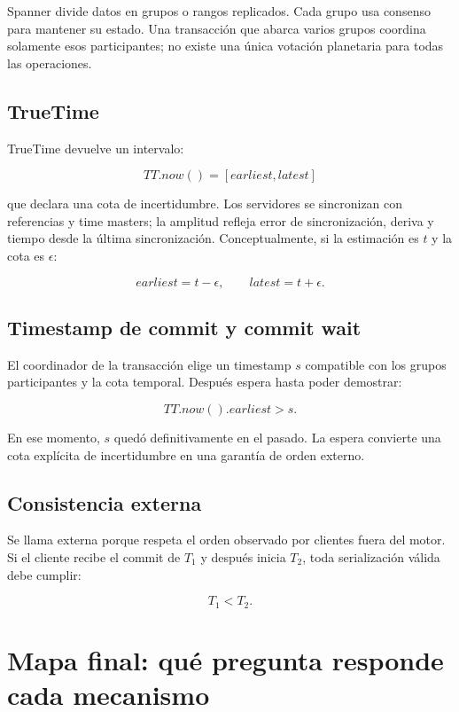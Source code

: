 \documentclass[variant=apuntes,cover=institutional,mode=screen]{ua-engineering-v6-article}
\begin{document}
Spanner divide datos en grupos o rangos replicados. Cada grupo usa consenso para mantener su estado. Una transacción que abarca varios grupos coordina solamente esos participantes; no existe una única votación planetaria para todas las operaciones.

\subsection{TrueTime}

TrueTime devuelve un intervalo:

\[
TT.now()=[earliest,latest]
\]

que declara una cota de incertidumbre. Los servidores se sincronizan con referencias y time masters; la amplitud refleja error de sincronización, deriva y tiempo desde la última sincronización. Conceptualmente, si la estimación es \(t\) y la cota es \(\epsilon\):

\[
earliest=t-\epsilon,\qquad latest=t+\epsilon.
\]

\subsection{Timestamp de commit y commit wait}

El coordinador de la transacción elige un timestamp \(s\) compatible con los grupos participantes y la cota temporal. Después espera hasta poder demostrar:

\[
TT.now().earliest>s.
\]

En ese momento, \(s\) quedó definitivamente en el pasado. La espera convierte una cota explícita de incertidumbre en una garantía de orden externo.

\subsection{Consistencia externa}

Se llama externa porque respeta el orden observado por clientes fuera del motor. Si el cliente recibe el commit de \(T_1\) y después inicia \(T_2\), toda serialización válida debe cumplir:

\[
T_1<T_2.
\]

\section{Mapa final: qué pregunta responde cada mecanismo}
\end{document}
